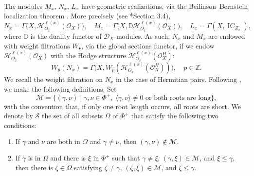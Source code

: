 \documentclass[12pt]{amsart}
\theoremstyle{definition}
\numberwithin{equation}{section}
\begin{document}
The modules $M_x$, $N_x$, $L_x$ have geometric realizations, via the Beilinson--Bernstein localization theorem \cite{BB}. More precisely (see \cite{schubertLC}*{Section 3.4}),
\begin{equation}
N_x=\Gamma\big(X,\mathscr{H}^{\ell(x)}_{O_x}(\mathscr{O}_X)\big), \quad M_x=\Gamma\big(X,\mathbb{D}\mathscr{H}^{\ell(x)}_{O_x}(\mathscr{O}_X)\big),\quad L_x=\Gamma(X,\operatorname{IC}_{Z_x}),
\end{equation}
where $\mathbb{D}$ is the duality functor of $\mathscr{D}_X$-modules. As such, $N_x$ and $M_x$ are endowed with weight filtrations $W_{\bullet}$, via the global sections functor, if we endow $\mathscr{H}^{\ell(x)}_{O_x}(\mathscr{O}_X)$ with the Hodge structure $\mathscr{H}^{\ell(x)}_{O_x}(\mathscr{O}_X^H)$:
\begin{equation}\label{eq:geometric-costandard}
W_p(N_x)=   \Gamma\big(X,W_p(\mathscr{H}^{\ell(x)}_{O_x}(\mathscr{O}_X^H))\big),\quad  p\in \mathbb{Z}.
\end{equation}
We recall the weight filtration on $N_x$ in the case of Hermitian pairs. Following \cite{cisWeight}, we make the following definitions. Set
\begin{equation}\label{eq:root-incompatibility}
 \mathscr M=\{(\gamma,\nu) \mid \gamma,\nu\in\Phi^+,\;
 \langle\gamma,\nu\rangle\ne0
 \text{ or both roots are long}\},
\end{equation}
with the convention that, if only one root length occurs, all roots are short. We denote by $\mathscr{S}$ the set of all subsets $\Omega$ of $\Phi^+$ that satisfy the following two conditions:
\begin{enumerate}
\item [(a)]  If $\gamma$ and $\nu$ are both in $\Omega$ and $\gamma \neq \nu$, then $(\gamma,\nu)\notin \mathscr{M}$. 

\item [(b)] If $\gamma$ is in $\Omega$ and there is $\xi$ in $\Phi^+$ such that $\gamma \neq \xi$, $(\gamma, \xi)\in \mathscr{M}$, and $\xi \leq \gamma$, then there is $\zeta \in \Omega$ satisfying $\zeta \neq \gamma$, $(\zeta,\xi)\in \mathscr{M}$, and $\zeta\leq \gamma$.
\end{enumerate}
\end{document}
